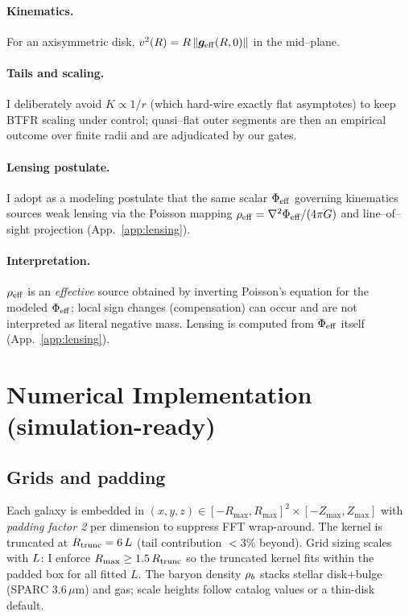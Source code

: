		\paragraph{Kinematics.}
		For an axisymmetric disk, $v^2(R)=R\,\lVert\bm{g}_{\mathrm{eff}}(R,0)\rVert$ in the mid--plane.
		
		\paragraph{Tails and scaling.}
		I deliberately avoid $K\propto 1/r$ (which hard-wire exactly flat asymptotes) to keep BTFR scaling under control; quasi--flat outer segments are then an empirical outcome over finite radii and are adjudicated by our gates.
		


		
		\paragraph{Lensing postulate.}
		I adopt as a modeling postulate that the same scalar $\Phi_{\rm eff}$ governing kinematics sources weak lensing via the Poisson mapping $\rho_{\rm eff}=\nabla^2\Phi_{\rm eff}/(4\pi G)$ and line–of–sight projection (App.~\ref{app:lensing}).
		\paragraph{Interpretation.} $\rho_{\rm eff}$ is an \emph{effective} source obtained by inverting Poisson’s equation for the modeled $\Phi_{\rm eff}$; local sign changes (compensation) can occur and are not interpreted as literal negative mass. Lensing is computed from $\Phi_{\rm eff}$ itself (App.~\ref{app:lensing}).
		
		\section{Numerical Implementation (simulation-ready)}\label{sec:numerics}
		\subsection{Grids and padding}\label{subsec:grids}
		Each galaxy is embedded in $(x,y,z)\in[-R_{\max},R_{\max}]^2\times[-Z_{\max},Z_{\max}]$ with \emph{padding factor 2} per dimension to suppress FFT wrap-around. The kernel is truncated at $R_{\rm trunc}=6\,L$ (tail contribution $<3\%$ beyond). Grid sizing scales with $L$: I enforce $R_{\max}\ge 1.5\,R_{\rm trunc}$ so the truncated kernel fits within the padded box for all fitted $L$. The baryon density $\rho_b$ stacks stellar disk+bulge (SPARC $3.6\,\mu$m) and gas; scale heights follow catalog values or a thin-disk default.
		
